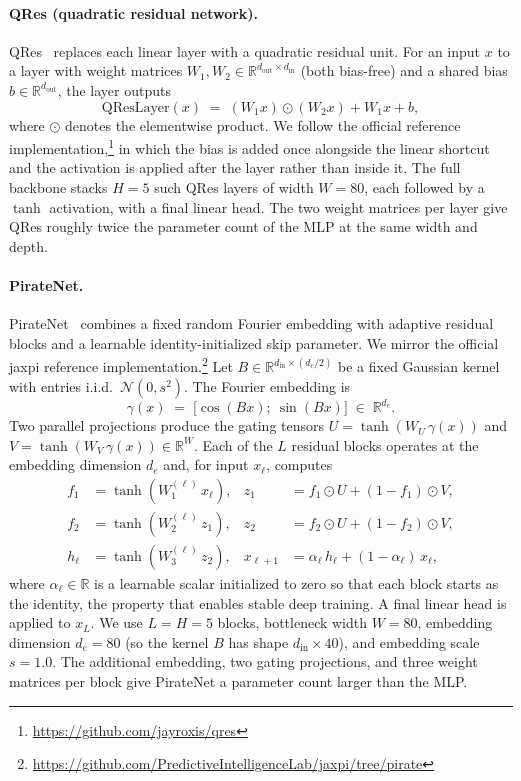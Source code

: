 \documentclass{article}
\theoremstyle{plain}
\theoremstyle{definition}
\theoremstyle{remark}
\begin{document}
\paragraph{QRes (quadratic residual network).}
QRes~\cite{Bu2021QRes} replaces each linear layer with a quadratic residual
unit. For an input $x$ to a layer with weight matrices
$W_1,W_2\in\mathbb{R}^{d_\mathrm{out}\times d_\mathrm{in}}$ (both bias-free)
and a shared bias $b\in\mathbb{R}^{d_\mathrm{out}}$, the layer outputs
\begin{equation}
    \mathrm{QResLayer}(x) \;=\; (W_1 x)\odot(W_2 x) + W_1 x + b,
\end{equation}
where $\odot$ denotes the elementwise product. We follow the official
reference implementation,\footnote{\url{https://github.com/jayroxis/qres}}
in which the bias is added once alongside the linear shortcut and the
activation is applied after the layer rather than inside it. The full
backbone stacks $H=5$ such QRes layers of width $W=80$, each followed by a
$\tanh$ activation, with a final linear head. The two weight matrices per
layer give QRes roughly twice the parameter count of the MLP at the same
width and depth.

\paragraph{PirateNet.}
PirateNet~\cite{Wang2024PirateNet} combines a fixed random Fourier embedding
with adaptive residual blocks and a learnable identity-initialized skip
parameter. We mirror the official jaxpi reference
implementation.\footnote{\url{https://github.com/PredictiveIntelligenceLab/jaxpi/tree/pirate}}
Let $B\in\mathbb{R}^{d_\mathrm{in}\times (d_e/2)}$ be a fixed Gaussian kernel
with entries i.i.d.\ $\mathcal{N}(0,s^{2})$. The Fourier embedding is
\begin{equation}
    \gamma(x) \;=\; \big[\cos(B x);\ \sin(B x)\big] \;\in\;
    \mathbb{R}^{d_e}.
\end{equation}
Two parallel projections produce the gating tensors
$U=\tanh(W_U\,\gamma(x))$ and $V=\tanh(W_V\,\gamma(x))\in\mathbb{R}^{W}$.
Each of the $L$ residual blocks operates at the embedding dimension $d_e$
and, for input $x_\ell$, computes
\begin{align}
    f_1 &= \tanh(W_1^{(\ell)}\, x_\ell), &
    z_1 &= f_1\odot U + (1-f_1)\odot V, \\
    f_2 &= \tanh(W_2^{(\ell)}\, z_1), &
    z_2 &= f_2\odot U + (1-f_2)\odot V, \\
    h_\ell &= \tanh(W_3^{(\ell)}\, z_2), &
    x_{\ell+1} &= \alpha_\ell\, h_\ell + (1-\alpha_\ell)\, x_\ell,
\end{align}
where $\alpha_\ell\in\mathbb{R}$ is a learnable scalar initialized to zero so
that each block starts as the identity, the property that enables stable
deep training. A final linear head is applied to $x_{L}$. We use $L=H=5$
blocks, bottleneck width $W=80$, embedding dimension $d_e=80$ (so the kernel
$B$ has shape $d_\mathrm{in}\times 40$), and embedding scale $s=1.0$. The
additional embedding, two gating projections, and three weight matrices per
block give PirateNet a parameter count larger than the MLP.
\end{document}
